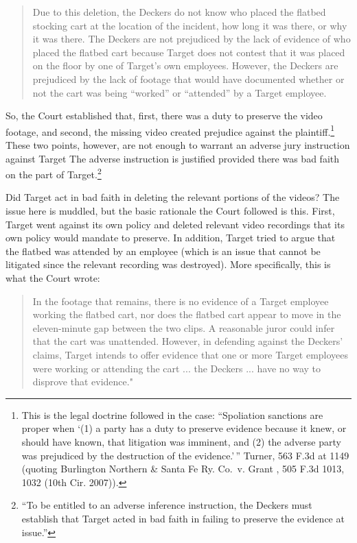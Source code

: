 \documentclass[
  10pt,
  dvipsnames,enabledeprecatedfontcommands]{scrartcl}
\begin{document}
\begin{quote}
Due to this deletion, the Deckers do not know who placed the flatbed stocking cart at the location of the incident, how long it was there, or why it was there. The Deckers are not prejudiced by the lack of evidence of who placed the flatbed cart because Target does not contest that it was placed on the floor by one of Target’s own employees. However, the Deckers are prejudiced by the lack of footage that would have documented  whether or not the cart was being “worked” or “attended” by a Target employee.
\end{quote}

\noindent So, the Court established that, first, there was a duty to
preserve the video footage, and second, the missing video created
prejudice against the plaintiff.\footnote{This is the legal doctrine
  followed in the case: ``Spoliation sanctions are proper when `(1) a
  party has a duty to preserve evidence because it knew, or should have
  known, that litigation was imminent, and (2) the adverse party was
  prejudiced by the destruction of the evidence.'\,'' Turner, 563 F.3d
  at 1149 (quoting Burlington Northern \& Santa Fe Ry. Co.~v. Grant ,
  505 F.3d 1013, 1032 (10th Cir. 2007)).} These two points, however, are
not enough to warrant an adverse jury instruction against Target The
adverse instruction is justified provided there was bad faith on the
part of Target.\footnote{``To be entitled to an adverse inference
  instruction, the Deckers must establish that Target acted in bad faith
  in failing to preserve the evidence at issue.''}

Did Target act in bad faith in deleting the relevant portions of the
videos? The issue here is muddled, but the basic rationale the Court
followed is this. First, Target went against its own policy and deleted
relevant video recordings that its own policy would mandate to preserve.
In addition, Target tried to argue that the flatbed was attended by an
employee (which is an issue that cannot be litigated since the relevant
recording was destroyed). More specifically, this is what the Court
wrote:

\begin{quote}
In the footage that remains, there is no evidence of a Target employee working the flatbed cart, nor does the flatbed cart appear to move in the eleven-minute gap between the two clips. A reasonable juror could infer that the cart was unattended. However, in defending against the Deckers’ claims, Target intends to offer evidence that one or more Target employees were working or attending the cart ... the Deckers ... have no way to disprove that evidence."
\end{quote}
\end{document}
